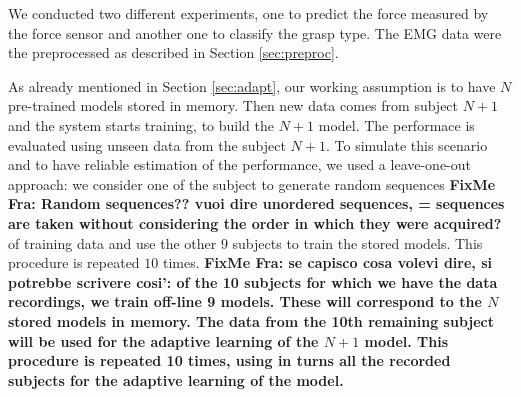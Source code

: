 We conducted two different experiments, one to predict the force measured
by the force sensor and another one to classify the grasp type.
The EMG data were the preprocessed as described in Section \ref{sec:preproc}.

As already mentioned in Section \ref{sec:adapt}, our working assumption is to have
 $N$ pre-trained models stored in memory.
Then new data comes from subject $N+1$ and the system starts
training, to build the $N+1$ model. 
The performace is evaluated using unseen data from the subject
$N+1$.
To simulate this scenario and to have reliable estimation of the
performance, we  used a leave-one-out approach: 
we consider one of the subject to generate random sequences
{\bf FixMe Fra: Random sequences?? vuoi dire unordered sequences, = sequences are taken without considering the order in which they were acquired?}
of training data and use the other $9$ subjects to train the stored models.
This procedure is repeated $10$ times.
{\bf FixMe Fra: se capisco cosa volevi dire, si potrebbe scrivere cosi':
of the 10 subjects for which we have the data recordings, we train off-line
9 models. These will correspond to the $N$ stored models in memory. The data from the 10th 
remaining subject will be used for the adaptive learning of the $N+1$ model. This procedure is repeated
10 times, using in turns all the recorded subjects for the adaptive learning of the model.
}


